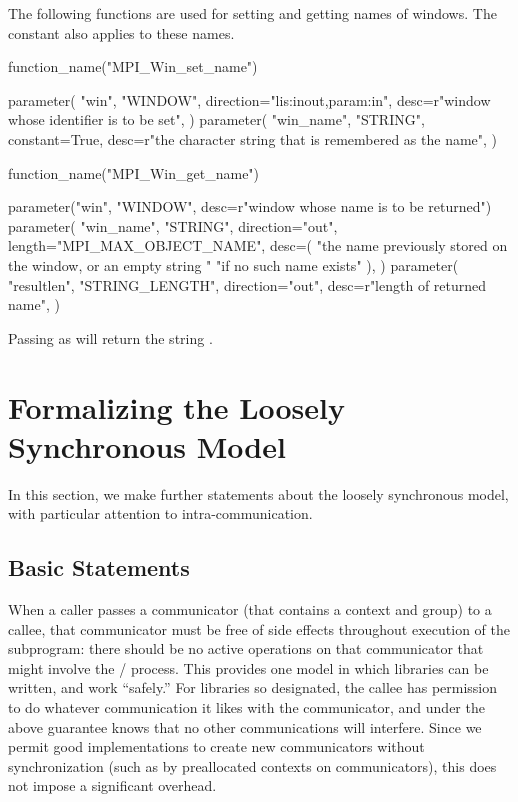 The following functions are used for setting and getting names of windows.
The constant  also applies to these names.

\begin{mpi-binding}
    function_name("MPI_Win_set_name")
    
    parameter(
        "win",
        "WINDOW",
        direction="lis:inout,param:in",
        desc=r"window whose identifier is to be set",
    )
    parameter(
        "win_name",
        "STRING",
        constant=True,
        desc=r"the character string that is remembered as the name",
    )
\end{mpi-binding}

\begin{mpi-binding}
    function_name("MPI_Win_get_name")
    
    parameter("win", "WINDOW", desc=r"window whose name is to be returned")
    parameter(
        "win_name",
        "STRING",
        direction="out",
        length="MPI_MAX_OBJECT_NAME",
        desc=(
            "the name previously stored on the window, or an empty string "
            "if no such name exists"
        ),
    )
    parameter(
        "resultlen",
        "STRING_LENGTH",
        direction="out",
        desc=r"length of returned name",
    )
\end{mpi-binding}

Passing  as  will
return the string .


\section{Formalizing the Loosely Synchronous Model}
\label{sec:formalizing}
In this section, we make further statements about the loosely
synchronous model, with particular attention to intra-communication.

\subsection{Basic Statements}
\label{sec:context:formal-basic}
When a caller passes a communicator (that contains a context and
group) to a callee, that communicator must be free of side effects
throughout execution of the subprogram: there should be no active
operations on that communicator that might involve the \MPI/ process.
This provides one
model in which libraries can be written, and work ``safely.'' For
libraries so designated, the callee has permission to do whatever
communication it likes with the communicator, and under the above
guarantee knows that no other communications will interfere. Since we
permit good implementations to create new communicators without
synchronization (such as by preallocated contexts on communicators),
this does not impose a significant overhead.

